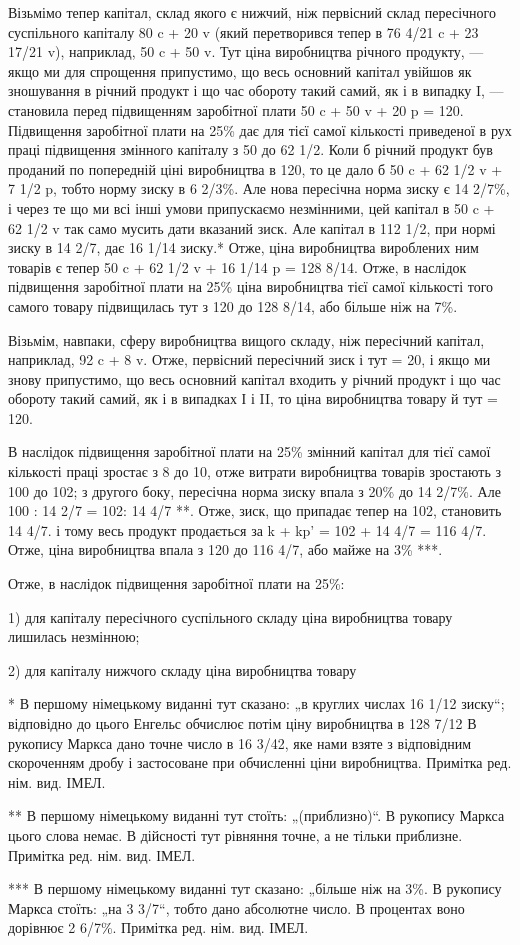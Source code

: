 Візьмімо тепер капітал, склад якого є нижчий, ніж первісний
склад пересічного суспільного капіталу 80 c + 20 v (який
перетворився тепер в 76 4/21 c + 23 17/21 v), наприклад, 50 c + 50 v.
Тут ціна виробництва річного продукту, — якщо ми для спрощення
припустимо, що весь основний капітал увійшов як зношування
в річний продукт і що час обороту такий самий, як
і в випадку I, — становила перед підвищенням заробітної плати
50 c + 50 v + 20 p = 120. Підвищення заробітної плати на 25\%
дає для тієї самої кількості приведеної в рух праці підвищення
змінного капіталу з 50 до 62 1/2. Коли б річний продукт був
проданий по попередній ціні виробництва в 120, то це дало б
50 c + 62 1/2 v + 7 1/2 p, тобто норму зиску в 6 2/3\%. Але нова пересічна
норма зиску є 14 2/7\%, і через те що ми всі інші умови
припускаємо незмінними, цей капітал в 50 c + 62 1/2 v так само
мусить дати вказаний зиск. Але капітал в 112 1/2, при нормі зиску
в 14 2/7, дає 16 1/14 зиску.* Отже, ціна виробництва вироблених
ним товарів є тепер 50 c + 62 1/2 v + 16 1/14 p = 128 8/14. Отже, в наслідок
підвищення заробітної плати на 25\% ціна виробництва
тієї самої кількості того самого товару підвищилась тут з 120
до 128 8/14, або більше ніж на 7\%.

Візьмім, навпаки, сферу виробництва вищого складу, ніж пересічний
капітал, наприклад, 92 c + 8 v. Отже, первісний пересічний
зиск і тут = 20, і якщо ми знову припустимо, що весь
основний капітал входить у річний продукт і що час обороту
такий самий, як і в випадках І і II, то ціна виробництва товару
й тут = 120.

В наслідок підвищення заробітної плати на 25\% змінний капітал
для тієї самої кількості праці зростає з 8 до 10, отже
витрати виробництва товарів зростають з 100 до 102; з другого
боку, пересічна норма зиску впала з 20\% до 14 2/7\%. Але
100 : 14 2/7 = 102: 14 4/7 **. Отже, зиск, що припадає тепер на 102,
становить 14 4/7. і тому весь продукт продається за k + kp' =
102 + 14 4/7 = 116 4/7. Отже, ціна виробництва впала з 120 до
116 4/7, або майже на 3\% ***.

Отже, в наслідок підвищення заробітної плати на 25\%:

1) для капіталу пересічного суспільного складу ціна виробництва
товару лишилась незмінною;

2) для капіталу нижчого складу ціна виробництва товару

* В першому німецькому виданні тут сказано: „в круглих числах 16 1/12
зиску“; відповідно до цього Енгельс обчислює потім ціну виробництва в 128 7/12
В рукопису Маркса дано точне число в 16 3/42, яке нами взяте з відповідним
скороченням дробу і застосоване при обчисленні ціни виробництва. Примітка
ред. нім. вид. ІМЕЛ.

** В першому німецькому виданні тут стоїть: „(приблизно)“. В рукопису
Маркса цього слова немає. В дійсності тут рівняння точне, а не тільки приблизне.
Примітка ред. нім. вид. ІМЕЛ.

*** В першому німецькому виданні тут сказано: „більше ніж на 3\%. В рукопису
Маркса стоїть: „на 3 3/7“, тобто дано абсолютне число. В процентах воно
дорівнює 2 6/7\%. Примітка ред. нім. вид. ІМЕЛ.
